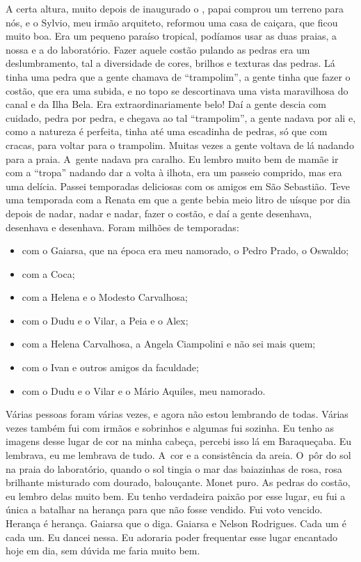 A certa altura, muito depois de inaugurado o , papai comprou um
terreno para nós, e o Sylvio, meu irmão arquiteto, reformou uma casa de
caiçara, que ficou muito boa. Era um pequeno paraíso tropical, podíamos
usar as duas praias, a nossa e a do laboratório. Fazer aquele costão
pulando as pedras era um deslumbramento, tal a diversidade de cores,
brilhos e texturas das pedras. Lá tinha uma pedra que a gente chamava de
``trampolim'', a gente tinha que fazer o costão, que era uma subida, e
no topo se descortinava uma vista maravilhosa do canal e da Ilha Bela.
Era extraordinariamente belo! Daí a gente descia com cuidado, pedra por
pedra, e chegava ao tal ``trampolim'', a gente nadava por ali e, como a
natureza é perfeita, tinha até uma escadinha de pedras, só que com
cracas, para voltar para o trampolim. Muitas vezes a gente voltava de lá
nadando para a praia. A~gente nadava pra caralho. Eu lembro muito bem
de mamãe ir com a ``tropa'' nadando dar a volta à ilhota, era um passeio
comprido, mas era uma delícia. Passei temporadas deliciosas com os
amigos em São Sebastião. Teve uma temporada com a Renata em que a gente
bebia meio litro de uísque por dia depois de nadar, nadar e nadar,
fazer o costão, e daí a gente desenhava, desenhava e desenhava. Foram
milhões de temporadas:

\begin{itemize}
\item
  com o Gaiarsa, que na época era meu namorado, o Pedro Prado, o
  Oswaldo;
\item
  com a Coca;
\item
  com a Helena e o Modesto Carvalhosa;
\item
  com o Dudu e o Vilar, a Peia e o Alex;
\item
  com a Helena Carvalhosa, a Angela Ciampolini e não sei mais quem;
\item
  com o Ivan e outros amigos da faculdade;
\item
  com o Dudu e o Vilar e o Mário Aquiles, meu namorado.
\end{itemize}
Várias pessoas foram várias vezes, e agora não estou lembrando de todas.
Várias vezes também fui com irmãos e sobrinhos e algumas fui
sozinha. Eu tenho as imagens desse lugar de cor na minha cabeça, percebi
isso lá em Baraqueçaba. Eu lembrava, eu me lembrava de tudo. A~cor e a
consistência da areia. O~pôr do sol na praia do laboratório, quando o
sol tingia o mar das baiazinhas de rosa, rosa brilhante misturado com
dourado, balouçante. Monet puro. As pedras do costão, eu lembro delas
muito bem. Eu tenho verdadeira paixão por esse lugar, eu fui a única a
batalhar na herança para que não fosse vendido. Fui voto vencido.
Herança é herança. Gaiarsa que o diga. Gaiarsa e Nelson Rodrigues. Cada
um é cada um. Eu dancei nessa. Eu adoraria poder frequentar esse lugar
encantado hoje em dia, sem dúvida me faria muito bem.

